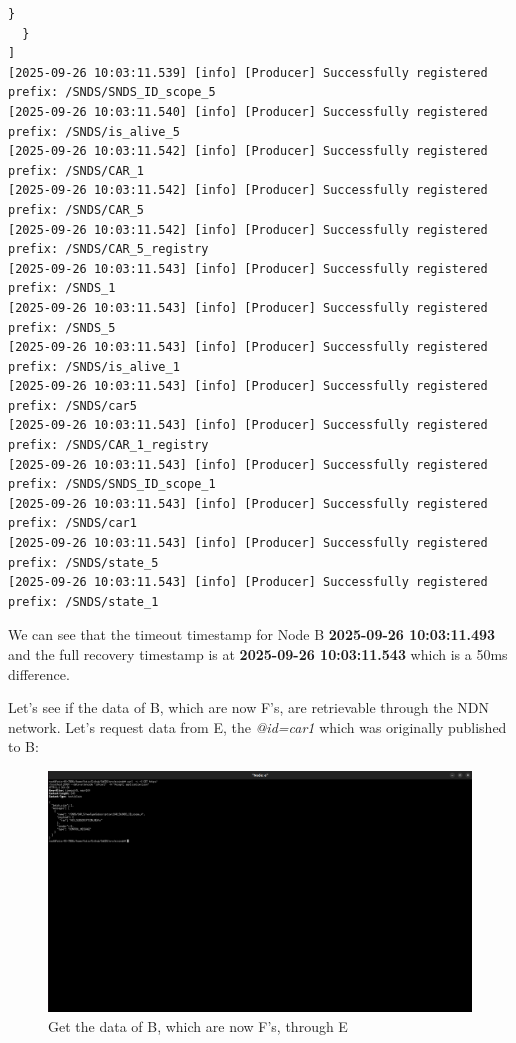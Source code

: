 \documentclass{article}
\begin{document}
\begin{lstlisting}[language=log, caption={Logs of Node F after providing the data of Node B}, label={lst:f-becoming-primary}]
    }
  }
]
[2025-09-26 10:03:11.539] [info] [Producer] Successfully registered prefix: /SNDS/SNDS_ID_scope_5
[2025-09-26 10:03:11.540] [info] [Producer] Successfully registered prefix: /SNDS/is_alive_5
[2025-09-26 10:03:11.542] [info] [Producer] Successfully registered prefix: /SNDS/CAR_1
[2025-09-26 10:03:11.542] [info] [Producer] Successfully registered prefix: /SNDS/CAR_5
[2025-09-26 10:03:11.542] [info] [Producer] Successfully registered prefix: /SNDS/CAR_5_registry
[2025-09-26 10:03:11.543] [info] [Producer] Successfully registered prefix: /SNDS_1
[2025-09-26 10:03:11.543] [info] [Producer] Successfully registered prefix: /SNDS_5
[2025-09-26 10:03:11.543] [info] [Producer] Successfully registered prefix: /SNDS/is_alive_1
[2025-09-26 10:03:11.543] [info] [Producer] Successfully registered prefix: /SNDS/car5
[2025-09-26 10:03:11.543] [info] [Producer] Successfully registered prefix: /SNDS/CAR_1_registry
[2025-09-26 10:03:11.543] [info] [Producer] Successfully registered prefix: /SNDS/SNDS_ID_scope_1
[2025-09-26 10:03:11.543] [info] [Producer] Successfully registered prefix: /SNDS/car1
[2025-09-26 10:03:11.543] [info] [Producer] Successfully registered prefix: /SNDS/state_5
[2025-09-26 10:03:11.543] [info] [Producer] Successfully registered prefix: /SNDS/state_1
\end{lstlisting}

We can see that the timeout timestamp for Node B \textbf{2025-09-26 10:03:11.493} and the full recovery timestamp is at \textbf{2025-09-26 10:03:11.543} which is a 50ms difference.

Let's see if the data of B, which are now F's, are retrievable through the NDN network. Let's request data from E, the \textit{@id=car1} which was originally published to B:

\begin{figure}[H]
    \centering
    \includegraphics[width=1\linewidth]{images/after_failure_through_e.png}
    \caption{Get the data of B, which are now F's, through E}
    \label{fig:after-failure-through-e}
\end{figure}
\end{document}
